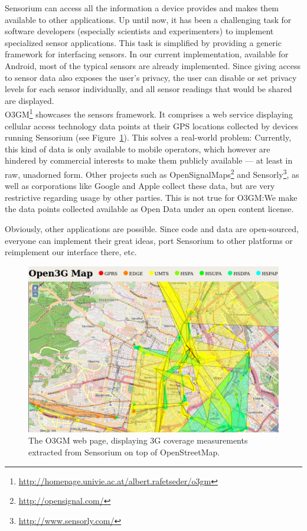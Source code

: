 Sensorium can access all the information a device provides and makes them available to other applications. Up until now, it has been a challenging task for software developers (especially scientists and experimenters) to implement specialized sensor applications. This task is simplified by providing a generic framework for interfacing sensors. In our current implementation, available for Android, most of the typical sensors are already implemented. Since giving access to sensor data also exposes the user's privacy, the user can disable or set privacy levels for each sensor individually, and all sensor readings that would be shared are displayed. %
\\

O3GM\footnote{\url{http://homepage.univie.ac.at/albert.rafetseder/o3gm}} showcases the sensors framework. It comprises a web service displaying cellular access technology data points at their \gls{GPS} locations collected by devices running Sensorium (see Figure~\ref{c5:fig:ogggm}). This solves a real-world problem: Currently, this kind of data is only available to mobile operators, which however  are hindered by commercial interests to make them publicly available --- at least in raw, unadorned form. Other projects such as OpenSignalMaps\footnote{\url{http://opensignal.com/}} and Sensorly\footnote{\url{http://www.sensorly.com/}}, as well as corporations like Google and Apple collect these data, but are very restrictive regarding usage by other parties. This is not true for O3GM:\@ We make the data points collected available as Open Data under an open content license.

Obviously, other applications are possible. Since code and data are open-sourced, everyone can implement their great ideas, port Sensorium to other platforms or reimplement our interface there, etc.

\begin{figure}[htb]
\centering
\includegraphics[width=\textwidth]{images/map-cells.png}
\caption{The O3GM web page, displaying \gls{3G} coverage measurements extracted from Sensorium on top of OpenStreetMap.}
\label{c5:fig:ogggm}
\end{figure}

